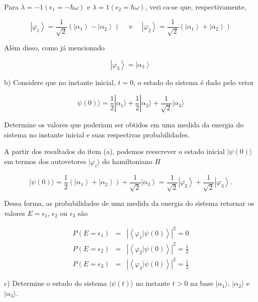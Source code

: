 \begin{enumerate}[start=1,label={\bfseries Q\arabic*.}]
{Para $\lambda=-1\left(\epsilon_{1}=-\hbar \omega\right) \text { e } \lambda=1\left(\epsilon_{2}=\hbar \omega\right)$, verica-se que, respectivamente,

$$
\left|\varphi_{1}\right\rangle=\frac{1}{\sqrt{2}}\left(\left|\alpha_{1}\right\rangle-\left|\alpha_{2}\right\rangle\right) \quad \text { e } \quad\left|\varphi_{2}\right\rangle=\frac{1}{\sqrt{2}}\left(\left|\alpha_{1}\right\rangle+\left|\alpha_{2}\right\rangle\right)
$$

Além disso, como já mencionado

$$
\left|\varphi_{3}\right\rangle=\left|\alpha_{3}\right\rangle
$$


}



b) Considere que no instante inicial, $t = 0$, o estado do sistema é dado pelo vetor

$$
\psi(0)\rangle = \frac{1}{2} | \alpha_{1} \rangle + \frac{1}{2} | \alpha_{2} \rangle + \frac{1}{\sqrt{2}} | \alpha_{3} \rangle
$$

Determine os valores que poderiam ser obtidos em uma medida da energia do sistema no instante inicial e suas respectivas probabilidades.

{\color{red}

A partir dos resultados do item (a), podemos reescrever o estado inicial $| \psi(0) \rangle$ em termos
dos autovetores $| \varphi_{i} \rangle$ do hamiltoniano $H$

$$
|\psi(0)\rangle=\frac{1}{2}\left(\left|\alpha_{1}\right\rangle+\left|\alpha_{2}\right\rangle\right)+\frac{1}{\sqrt{2}}\left|\alpha_{3}\right\rangle=
\frac{1}{\sqrt{2}}\left|\varphi_{2}\right\rangle+\frac{1}{\sqrt{2}}\left|\varphi_{3}\right\rangle.
$$

Dessa forma, as probabilidades de uma medida da energia do sistema retornar os valores $E = \epsilon_{1}$, $\epsilon_{2}$ ou $\epsilon_{3}$ são


\begin{eqnarray*}
P\left(E=\epsilon_{1}\right) &=& \left|\left\langle\varphi_{1} | \psi(0)\right\rangle\right|^{2}=0\\
P\left(E=\epsilon_{2}\right) &=& \left|\left\langle\varphi_{2} | \psi(0)\right\rangle\right|^{2}=\frac{1}{2}\\
P\left(E=\epsilon_{3}\right) &=& \left|\left\langle\varphi_{3} | \psi(0)\right\rangle\right|^{2}=\frac{1}{2}
\end{eqnarray*}


}


c) Determine o estado do sistema $|\psi(t)\rangle$ no instante $t > 0$ na base $| \alpha_{1} \rangle$, $| \alpha_{2} \rangle$ e $| \alpha_{3} \rangle$.


\end{enumerate}
